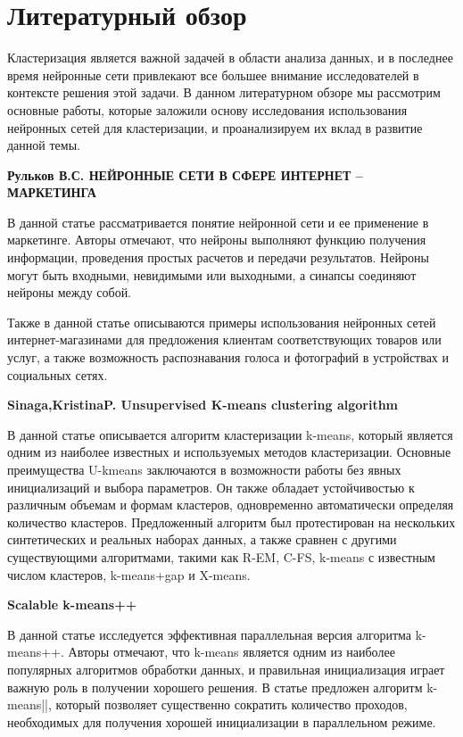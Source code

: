 \section*{Литературный обзор}

Кластеризация является важной задачей в области анализа данных, и в последнее время нейронные сети привлекают все большее внимание исследователей в контексте решения этой задачи. В данном литературном обзоре мы рассмотрим основные работы, которые заложили основу исследования использования нейронных сетей для кластеризации, и проанализируем их вклад в развитие данной темы.

\textbf{Рульков В.С. НЕЙРОННЫЕ СЕТИ В СФЕРЕ ИНТЕРНЕТ -- МАРКЕТИНГА}

В данной статье \cite{rulkov2018neural} рассматривается понятие нейронной сети и ее применение в маркетинге. Авторы отмечают, что нейроны выполняют функцию получения информации, проведения простых расчетов и передачи результатов. Нейроны могут быть входными, невидимыми или выходными, а синапсы соединяют нейроны между собой.

Также в данной статье описываются примеры использования нейронных сетей интернет-магазинами для предложения клиентам соответствующих товаров или услуг, а также возможность распознавания голоса и фотографий в устройствах и социальных сетях.

\textbf{Sinaga,KristinaP. Unsupervised K-means clustering algorithm}

В данной статье \cite{sinaga2020unsupervised} описывается алгоритм кластеризации k-means, который является одним из наиболее известных и используемых методов кластеризации. Основные преимущества U-kmeans заключаются в возможности работы без явных инициализаций и выбора параметров. Он также обладает устойчивостью к различным объемам и формам кластеров, одновременно автоматически определяя количество кластеров. Предложенный алгоритм был протестирован на нескольких синтетических и реальных наборах данных, а также сравнен с другими существующими алгоритмами, такими как R-EM, C-FS, k-means с известным числом кластеров, k-means+gap и X-means.

\textbf{Scalable k-means++}

В данной статье \cite{bahmani2012scalable} исследуется эффективная параллельная версия алгоритма k-means++. Авторы отмечают, что k-means является одним из наиболее популярных алгоритмов обработки данных, и правильная инициализация играет важную роль в получении хорошего решения. В статье предложен алгоритм k-means||, который позволяет существенно сократить количество проходов, необходимых для получения хорошей инициализации в параллельном режиме. 